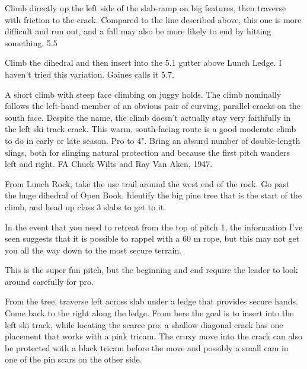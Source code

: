 \documentclass{tahquitz}
\begin{document}
 Climb directly up the left side of the slab-ramp on big features, then
traverse with friction to the crack. Compared to the line described above,
this one is more difficult and run out, and a fall may also be more likely to end by hitting
something. 5.5

 Climb the dihedral and then insert into the 5.1 gutter above Lunch Ledge.
I haven't tried this variation. Gaines calls it 5.7.

\somespace

\upfriction




A short climb with steep face climbing on juggy holds. 
The climb nominally follows the left-hand member of an obvious pair of curving,
parallel cracks on the south face.
Despite the name, the climb doesn't actually stay very faithfully in the left ski track
crack. This warm, south-facing route is a good moderate climb to do in early or late season.
Pro to 4". Bring an absurd number of double-length slings, both for slinging natural
protection and because the first pitch wanders left and right. FA Chuck Wilts and Ray Van Aken, 1947.

From Lunch Rock, take the use trail around the west end of the rock.
Go past the huge dihedral of Open Book. Identify the big pine tree that
is the start of the climb, and head up class 3 slabs to get to it.

In the event that you need to retreat from the top of pitch 1, the information
I've seen suggests that it is possible to rappel with a 60 m rope, but this may
not get you all the way down  to the most secure terrain.

\somespace

 This is the super fun pitch, but the beginning and end
require the leader to look around carefully for pro.

From the tree, traverse left across slab under a ledge that
provides secure hands. Come back to the right along the ledge. From here the goal is
to insert into the left ski track, while locating the scarce pro;
a shallow diagonal crack has one placement that works with a pink tricam.
The cruxy move into the crack can also be protected with a black tricam before
the move and possibly a small cam in one of the pin scars on the other side.
\end{document}
